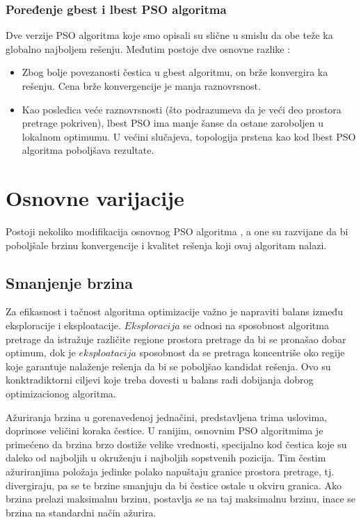 \documentclass[a4paper]{article}
\begin{document}
\subsubsection{Poređenje gbest i lbest PSO algoritma}
Dve verzije PSO algoritma koje smo opisali su slične u smislu da obe teže ka globalno najboljem rešenju. Međutim postoje dve osnovne razlike \cite{engelbrecht2007computational}:
\begin{itemize}
    \item Zbog bolje povezanosti čestica u gbest algoritmu, on brže konvergira ka rešenju. Cena brže konvergencije je manja raznovrsnost.
    \item Kao posledica veće raznovrsnosti (što podrazumeva da je veći deo prostora pretrage pokriven), lbest PSO ima manje šanse da ostane zaroboljen u lokalnom optimumu. U većini slučajeva, topologija prstena kao kod lbest PSO algoritma poboljšava rezultate.
\end{itemize}

\section{Osnovne varijacije}
Postoji nekoliko modifikacija osnovnog PSO algoritma \cite{rini2011particle}, a one su razvijane da bi poboljšale brzinu konvergencije i kvalitet rešenja koji ovaj algoritam nalazi.

\subsection{Smanjenje brzina}
Za efikasnost i tačnost algoritma optimizacije važno je napraviti balans između eksploracije i eksploatacije. 
$Eksploracija$ se odnosi na sposobnost algoritma pretrage da istražuje različite regione prostora pretrage da bi se pronašao dobar optimum, dok je $eksploatacija$ sposobnost  da se pretraga koncentriše oko regije koje garantuje nalaženje rešenja da bi se poboljšao kandidat rešenja. Ovo su konktradiktorni ciljevi koje treba dovesti u balans radi dobijanja dobrog optimizacionog algoritma.

Ažuriranja brzina u gorenavedenoj jednačini, predstavljena trima uslovima, doprinose veličini koraka čestice. U ranijim, osnovnim PSO algoritmima je primećeno da brzina brzo dostiže velike vrednosti, specijalno kod čestica koje su daleko od najboljih u okruženju i najboljih sopstvenih pozicija. Tim čestim ažuriranjima položaja jedinke polako napuštaju granice prostora pretrage, tj. divergiraju, pa se te brzine smanjuju da bi čestice ostale u okviru granica. Ako brzina prelazi maksimalnu brzinu, postavlja se na taj maksimalnu brzinu, inace se brzina na standardni način ažurira.
\end{document}
